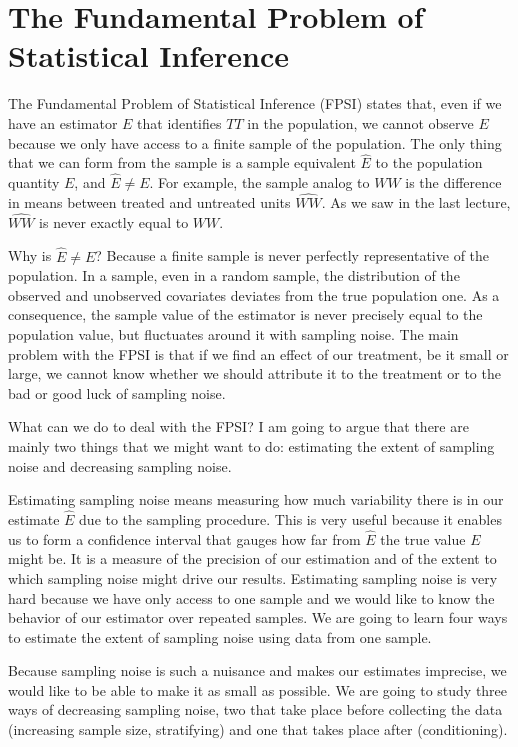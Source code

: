 \documentclass[]{book}
\theoremstyle{definition}
\theoremstyle{definition}
\theoremstyle{definition}
\theoremstyle{remark}
\begin{document}
\chapter{The Fundamental Problem of Statistical
Inference}\label{the-fundamental-problem-of-statistical-inference}

The Fundamental Problem of Statistical Inference (FPSI) states that,
even if we have an estimator \(E\) that identifies \(TT\) in the
population, we cannot observe \(E\) because we only have access to a
finite sample of the population. The only thing that we can form from
the sample is a sample equivalent \(\hat{E}\) to the population quantity
\(E\), and \(\hat{E}\neq E\). For example, the sample analog to \(WW\)
is the difference in means between treated and untreated units
\(\hat{WW}\). As we saw in the last lecture, \(\hat{WW}\) is never
exactly equal to \(WW\).

Why is \(\hat{E}\neq E\)? Because a finite sample is never perfectly
representative of the population. In a sample, even in a random sample,
the distribution of the observed and unobserved covariates deviates from
the true population one. As a consequence, the sample value of the
estimator is never precisely equal to the population value, but
fluctuates around it with sampling noise. The main problem with the FPSI
is that if we find an effect of our treatment, be it small or large, we
cannot know whether we should attribute it to the treatment or to the
bad or good luck of sampling noise.

What can we do to deal with the FPSI? I am going to argue that there are
mainly two things that we might want to do: estimating the extent of
sampling noise and decreasing sampling noise.

Estimating sampling noise means measuring how much variability there is
in our estimate \(\hat{E}\) due to the sampling procedure. This is very
useful because it enables us to form a confidence interval that gauges
how far from \(\hat{E}\) the true value \(E\) might be. It is a measure
of the precision of our estimation and of the extent to which sampling
noise might drive our results. Estimating sampling noise is very hard
because we have only access to one sample and we would like to know the
behavior of our estimator over repeated samples. We are going to learn
four ways to estimate the extent of sampling noise using data from one
sample.

Because sampling noise is such a nuisance and makes our estimates
imprecise, we would like to be able to make it as small as possible. We
are going to study three ways of decreasing sampling noise, two that
take place before collecting the data (increasing sample size,
stratifying) and one that takes place after (conditioning).
\end{document}

